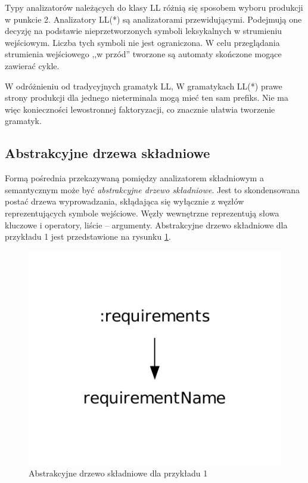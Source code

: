 Typy analizatorów należących do klasy LL różnią się sposobem wyboru produkcji w punkcie 2. 
Analizatory LL(*) są analizatorami przewidującymi. Podejmują one decyzję na
podstawie nieprzetworzonych symboli leksykalnych w strumieniu wejściowym. Liczba
tych symboli nie jest ograniczona. W celu przeglądania strumienia wejściowego 
,,w przód'' tworzone są automaty skończone mogące zawierać cykle.

W odróżnieniu od tradycyjnych gramatyk LL, W gramatykach LL(*) prawe strony
produkcji dla jednego nieterminala mogą mieć ten sam prefiks. Nie ma więc 
konieczności lewostronnej faktoryzacji, co znacznie ułatwia tworzenie
gramatyk.

\subsection{Abstrakcyjne drzewa składniowe}

Formą pośrednia przekazywaną pomiędzy analizatorem składniowym a semantycznym
może być \emph{abstrakcyjne drzewo składniowe}. Jest to skondensowana postać drzewa
wyprowadzania, skłądająca się
wyłącznie z węzłów reprezentujących symbole wejściowe. Węzły
wewnętrzne reprezentują słowa kluczowe i operatory, liście -- argumenty.
Abstrakcyjne drzewo składniowe dla przykładu 1 jest przedstawione na rysunku 
\ref{antlr_ast}.

\begin{figure}[h!]
  \centering
    \includegraphics[scale=0.8]{img/antlr_ast.pdf}
    \caption{Abstrakcyjne drzewo składniowe dla przykładu 1}
    \label{antlr_ast}
\end{figure}

